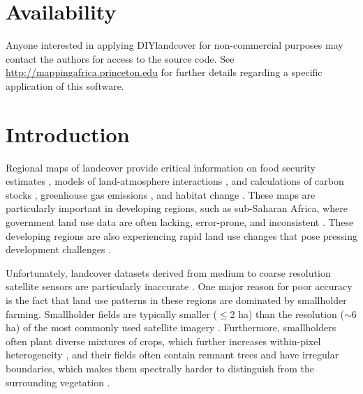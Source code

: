 \documentclass[preprint,12pt,authoryear]{elsarticle}
\begin{document}
\linenumbers

\section*{Availability}
\indent Anyone interested in applying DIYlandcover for non-commercial purposes may contact the authors for access to the source code. See \\ \href{http://mappingafrica.princeton.edu}{http://mappingafrica.princeton.edu} for further details regarding a specific application of this software.

\section{Introduction}
Regional maps of landcover provide critical information on food security estimates \citep[e.g.][]{monfreda_farming_2008,licker_mind_2010,see_improved_2015,lobell_use_2013}, models of land-atmosphere interactions \citep[e.g.][]{liang_simple_1994}, and calculations of carbon stocks \citep[e.g.][]{ruesch_new_2008}, greenhouse gas emissions \citep[e.g.][]{searchinger_high_2015}, and habitat change \citep[e.g.][]{gibbs_tropical_2010}. These maps are particularly important in developing regions, such as sub-Saharan Africa, where government land use data are often lacking, error-prone, and inconsistent \citep{ramankutty_farming_2008,see_improved_2015}. These developing regions are also experiencing rapid land use changes \citep{gibbs_tropical_2010,rulli_global_2013} that pose pressing development challenges \citep[e.g. how to feed people at substantially lower environmental cost][]{searchinger_high_2015}. 

Unfortunately, landcover datasets derived from medium to coarse resolution satellite sensors are particularly inaccurate \citep{fritz_comparison_2010, fritz_identifying_2008}. One major reason for  poor accuracy is the fact that land use patterns in these regions are dominated by smallholder farming. Smallholder fields are typically smaller ($\leq$2 ha) than the resolution ($\sim$6 ha) of the most commonly used satellite imagery \citep{jain_mapping_2013}. Furthermore, smallholders often plant diverse mixtures of crops, which further increases within-pixel heterogeneity \citep{jain_mapping_2013}, and their fields often contain remnant trees and have irregular boundaries, which makes them spectrally harder to distinguish from the surrounding vegetation \citep{see_improved_2015, lobell_use_2013}. 
\end{document}
